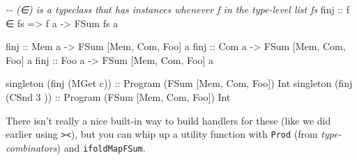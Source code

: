 \documentclass[]{article}
\newenvironment{Shaded}{}{}
\newcommand{\CharTok}[1]{\textcolor[rgb]{0.25,0.44,0.63}{#1}}
\newcommand{\CommentTok}[1]{\textcolor[rgb]{0.38,0.63,0.69}{\textit{#1}}}
\newcommand{\DataTypeTok}[1]{\textcolor[rgb]{0.56,0.13,0.00}{#1}}
\newcommand{\DecValTok}[1]{\textcolor[rgb]{0.25,0.63,0.44}{#1}}
\newcommand{\FunctionTok}[1]{\textcolor[rgb]{0.02,0.16,0.49}{#1}}
\newcommand{\KeywordTok}[1]{\textcolor[rgb]{0.00,0.44,0.13}{\textbf{#1}}}
\newcommand{\NormalTok}[1]{#1}
\newcommand{\OperatorTok}[1]{\textcolor[rgb]{0.40,0.40,0.40}{#1}}
\newcommand{\OtherTok}[1]{\textcolor[rgb]{0.00,0.44,0.13}{#1}}
\begin{document}
\begin{Shaded}
\begin{Highlighting}[]
\CommentTok{{-}{-} (∈) is a typeclass that has instances whenever f in the type{-}level list fs}
\OtherTok{finj ::}\NormalTok{ f ∈ fs }\OtherTok{=\textgreater{}}\NormalTok{ f a }\OtherTok{{-}\textgreater{}} \DataTypeTok{FSum}\NormalTok{ fs a}

\OtherTok{finj ::} \DataTypeTok{Mem}\NormalTok{ a }\OtherTok{{-}\textgreater{}} \DataTypeTok{FSum}\NormalTok{ \textquotesingle{}[}\DataTypeTok{Mem}\NormalTok{, }\DataTypeTok{Com}\NormalTok{, }\DataTypeTok{Foo}\NormalTok{] a}
\OtherTok{finj ::} \DataTypeTok{Com}\NormalTok{ a }\OtherTok{{-}\textgreater{}} \DataTypeTok{FSum}\NormalTok{ \textquotesingle{}[}\DataTypeTok{Mem}\NormalTok{, }\DataTypeTok{Com}\NormalTok{, }\DataTypeTok{Foo}\NormalTok{] a}
\OtherTok{finj ::} \DataTypeTok{Foo}\NormalTok{ a }\OtherTok{{-}\textgreater{}} \DataTypeTok{FSum}\NormalTok{ \textquotesingle{}[}\DataTypeTok{Mem}\NormalTok{, }\DataTypeTok{Com}\NormalTok{, }\DataTypeTok{Foo}\NormalTok{] a}

\NormalTok{singleton (finj (}\DataTypeTok{MGet} \CharTok{\textquotesingle{}c\textquotesingle{}}\NormalTok{))}\OtherTok{ ::} \DataTypeTok{Program}\NormalTok{ (}\DataTypeTok{FSum}\NormalTok{ \textquotesingle{}[}\DataTypeTok{Mem}\NormalTok{, }\DataTypeTok{Com}\NormalTok{, }\DataTypeTok{Foo}\NormalTok{]) }\DataTypeTok{Int}
\NormalTok{singleton (finj (}\DataTypeTok{CSnd} \DecValTok{3}\NormalTok{  ))}\OtherTok{ ::} \DataTypeTok{Program}\NormalTok{ (}\DataTypeTok{FSum}\NormalTok{ \textquotesingle{}[}\DataTypeTok{Mem}\NormalTok{, }\DataTypeTok{Com}\NormalTok{, }\DataTypeTok{Foo}\NormalTok{]) }\DataTypeTok{Int}
\end{Highlighting}
\end{Shaded}

There isn't really a nice built-in way to build handlers for these (like we did
earlier using \texttt{\textgreater{}\textbar{}\textless{}}), but you can whip up
a utility function with \texttt{Prod} (from \emph{type-combinators}) and
\texttt{ifoldMapFSum}.

\begin{Shaded}
\end{Shaded}
\end{document}
